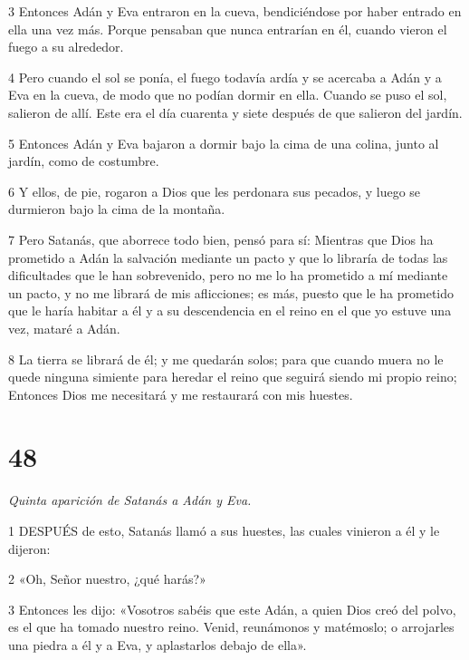 \par 3 Entonces Adán y Eva entraron en la cueva, bendiciéndose por haber entrado en ella una vez más. Porque pensaban que nunca entrarían en él, cuando vieron el fuego a su alrededor.

\par 4 Pero cuando el sol se ponía, el fuego todavía ardía y se acercaba a Adán y a Eva en la cueva, de modo que no podían dormir en ella. Cuando se puso el sol, salieron de allí. Este era el día cuarenta y siete después de que salieron del jardín.

\par 5 Entonces Adán y Eva bajaron a dormir bajo la cima de una colina, junto al jardín, como de costumbre.

\par 6 Y ellos, de pie, rogaron a Dios que les perdonara sus pecados, y luego se durmieron bajo la cima de la montaña.

\par 7 Pero Satanás, que aborrece todo bien, pensó para sí: Mientras que Dios ha prometido a Adán la salvación mediante un pacto y que lo libraría de todas las dificultades que le han sobrevenido, pero no me lo ha prometido a mí mediante un pacto, y no me librará de mis aflicciones; es más, puesto que le ha prometido que le haría habitar a él y a su descendencia en el reino en el que yo estuve una vez, mataré a Adán.

\par 8 La tierra se librará de él; y me quedarán solos; para que cuando muera no le quede ninguna simiente para heredar el reino que seguirá siendo mi propio reino; Entonces Dios me necesitará y me restaurará con mis huestes.

\chapter{48}

\par \textit{Quinta aparición de Satanás a Adán y Eva.}

\par 1 DESPUÉS de esto, Satanás llamó a sus huestes, las cuales vinieron a él y le dijeron:

\par 2 «Oh, Señor nuestro, ¿qué harás?»

\par 3 Entonces les dijo: «Vosotros sabéis que este Adán, a quien Dios creó del polvo, es el que ha tomado nuestro reino. Venid, reunámonos y matémoslo; o arrojarles una piedra a él y a Eva, y aplastarlos debajo de ella».

